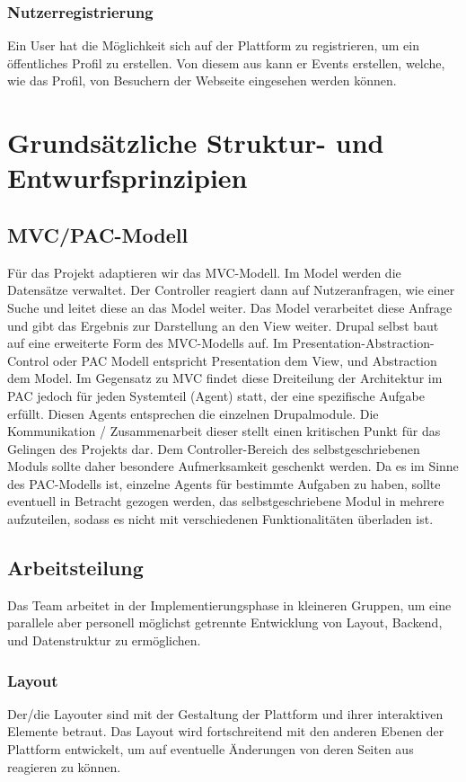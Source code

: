 \documentclass{swp}
\begin{document}
\subsubsection{Nutzerregistrierung}
Ein User hat die M\"oglichkeit sich auf der Plattform zu registrieren, um ein \"offentliches Profil zu erstellen. Von diesem aus kann er Events erstellen, welche, wie das Profil, von Besuchern der Webseite eingesehen werden k\"onnen.
\section{Grunds\"atzliche Struktur- und Entwurfsprinzipien}
\subsection{MVC/PAC-Modell}
F\"ur das Projekt adaptieren wir das MVC-Modell. Im Model werden die Datens\"atze verwaltet. Der Controller reagiert dann auf Nutzeranfragen, wie einer Suche und leitet diese an das Model weiter. Das Model verarbeitet diese Anfrage und gibt das Ergebnis zur Darstellung an den View weiter. Drupal selbst baut auf eine erweiterte Form des MVC-Modells auf. Im Presentation-Abstraction-Control oder PAC Modell entspricht Presentation dem View, und Abstraction dem Model. Im Gegensatz zu MVC findet diese Dreiteilung der Architektur im PAC jedoch f\"ur jeden Systemteil (\glqq Agent\grqq{}) statt, der eine spezifische Aufgabe erf\"ullt. Diesen Agents entsprechen die einzelnen Drupalmodule. Die Kommunikation / Zusammenarbeit dieser stellt einen kritischen Punkt f\"ur das Gelingen des Projekts dar. Dem Controller-Bereich des selbstgeschriebenen Moduls sollte daher besondere Aufmerksamkeit geschenkt werden. Da es im Sinne des PAC-Modells ist, einzelne \glqq Agents\grqq{} f\"ur bestimmte Aufgaben zu haben, sollte eventuell in Betracht gezogen werden, das selbstgeschriebene Modul in mehrere aufzuteilen, sodass es nicht mit verschiedenen Funktionalit\"aten \"uberladen ist.
\subsection{Arbeitsteilung}
Das Team arbeitet in der Implementierungsphase in kleineren Gruppen, um eine parallele aber personell m\"oglichst getrennte Entwicklung von Layout, Backend, und Datenstruktur zu erm\"oglichen.
\subsubsection{Layout}
Der/die Layouter sind mit der Gestaltung der Plattform und ihrer interaktiven Elemente betraut. Das Layout wird fortschreitend mit den anderen Ebenen der Plattform entwickelt, um auf eventuelle \"Anderungen von deren Seiten aus reagieren zu k\"onnen.
\end{document}
